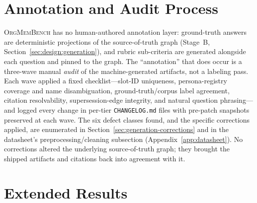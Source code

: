 \documentclass[11pt]{article}
\newcommand{\bench}{\textsc{OrgMemBench}\xspace}
\begin{document}
\section{Annotation and Audit Process}
\label{app:annotation}
\bench{} has no human-authored annotation layer: ground-truth answers are
deterministic projections of the source-of-truth graph (Stage~B,
Section~\ref{sec:design:generation}), and rubric sub-criteria are generated
alongside each question and pinned to the graph. The ``annotation'' that does
occur is a three-wave manual \emph{audit} of the machine-generated artifacts,
not a labeling pass. Each wave applied a fixed checklist---slot-ID uniqueness,
persona-registry coverage and name disambiguation, ground-truth/corpus label
agreement, citation resolvability, supersession-edge integrity, and natural
question phrasing---and logged every change in per-tier \texttt{CHANGELOG.md}
files with pre-patch snapshots preserved at each wave. The six defect classes
found, and the specific corrections applied, are enumerated in
Section~\ref{sec:generation-corrections} and in the datasheet's
preprocessing/cleaning subsection (Appendix~\ref{app:datasheet}). No corrections
altered the underlying source-of-truth graph; they brought the shipped artifacts
and citations back into agreement with it.



\section{Extended Results}
\label{app:extended}
\end{document}
